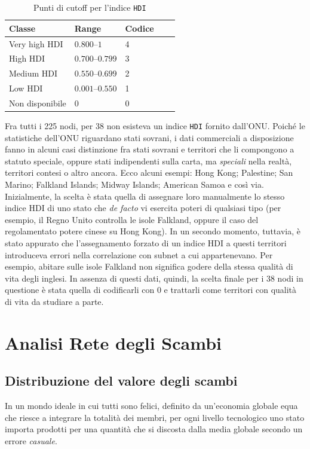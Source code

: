 \documentclass[]{article}
\begin{document}
\begin{multicols}{2}
\begin{figure}[b]
		\label{fig:distribuzione}
	\end{figure}
	\begin{table}[H]
		\centering
		\caption{Punti di cutoff per l'indice \texttt{HDI}}
		\label{hdicutoff}
		\begin{tabular}{@{}lllll@{}}
			\toprule
			Classe & Range & Codice \\ \midrule
			Very high HDI & $0.800–1$ & 4 \\
			High HDI & $0.700–0.799$ & 3 \\
			Medium HDI & $0.550–0.699$ & 2 \\
			Low HDI & $0.001–0.550$ & 1 \\ 
			Non disponibile & 0 & 0 \\ \bottomrule
			\hline 
		\end{tabular}
	\end{table}	
	Fra tutti i 225 nodi, per 38 non esisteva un indice \texttt{HDI} fornito dall'ONU. Poiché le statistiche dell'ONU riguardano stati sovrani, i dati commerciali a disposizione fanno in alcuni casi distinzione fra stati sovrani e territori che li compongono a statuto speciale, oppure stati indipendenti sulla carta, ma \textit{speciali} nella realtà, territori contesi o altro ancora. Ecco alcuni esempi: Hong Kong; Palestine; San Marino; Falkland Islands; Midway Islands; American Samoa e così via. Inizialmente, la scelta è stata quella di assegnare loro manualmente lo stesso indice HDI di uno stato che \textit{de facto} vi esercita poteri di qualsiasi tipo (per esempio, il Regno Unito controlla le isole Falkland, oppure il caso del regolamentato potere cinese su Hong Kong). In un secondo momento, tuttavia, è stato appurato che l'assegnamento forzato di un indice HDI a questi territori introduceva errori nella correlazione con subnet a cui appartenevano. Per esempio, abitare sulle isole Falkland non significa godere della stessa qualità di vita degli inglesi. In assenza di questi dati, quindi, la scelta finale per i 38 nodi in questione è stata quella di codificarli con 0 e trattarli come territori con qualità di vita da studiare a parte.
	
	\section{Analisi Rete degli Scambi}
	\subsection{Distribuzione del valore degli scambi}
	In un mondo ideale in cui tutti sono felici, definito da un'economia globale equa che riesce a integrare la totalità dei membri, per ogni livello tecnologico uno stato importa prodotti per una quantità che si discosta dalla media globale secondo un errore \textit{casuale}.
	

\end{multicols}
\end{document}
